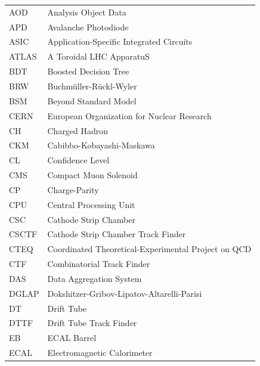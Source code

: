 \documentclass[12pt]{thesis}  %
\begin{document}
\begin{longtable}[l]{@{}l@{\ \ \ \ \ \ \ \ \ \ \ \ }l}
AOD        & Analysis Object Data \\
APD        & Avalanche Photodiode \\
ASIC       & Application-Specific Integrated Circuits \\
ATLAS      & A Toroidal LHC ApparatuS \\
BDT        & Boosted Decision Tree \\
BRW        & Buchm\"{u}ller-R\"{u}ckl-Wyler \\
BSM        & Beyond Standard Model \\
CERN       & European Organization for Nuclear Research \\
CH         & Charged Hadron \\
CKM        & Cabibbo-Kobayashi-Maskawa \\
CL         & Confidence Level \\
CMS        & Compact Muon Solenoid \\
CP         & Charge-Parity \\
CPU        & Central Processing Unit \\
CSC        & Cathode Strip Chamber \\
CSCTF      & Cathode Strip Chamber Track Finder \\
CTEQ       & Coordinated Theoretical-Experimental Project on QCD \\
CTF        & Combinatorial Track Finder \\
DAS        & Data Aggregation System \\
DGLAP      & Dokshitzer-Gribov-Lipatov-Altarelli-Parisi \\
DT         & Drift Tube \\
DTTF       & Drift Tube Track Finder \\
EB         & ECAL Barrel \\
ECAL       & Electromagnetic Calorimeter \\

\end{longtable}
\end{document}
